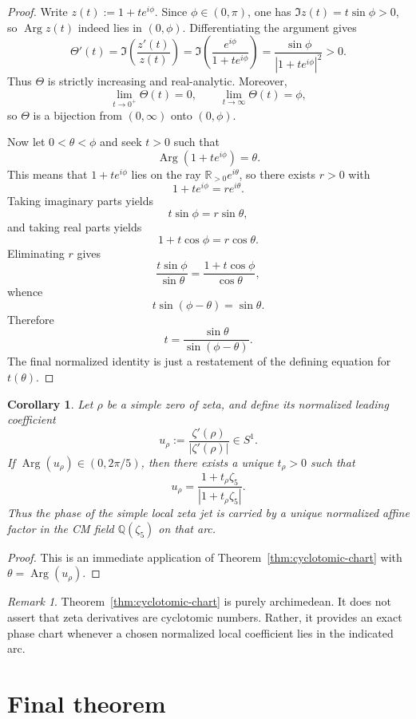 \documentclass[11pt,a4paper]{article}
\newtheorem{corollary}[theorem]{Corollary}
\theoremstyle{definition}
\theoremstyle{remark}
\newtheorem{remark}[theorem]{Remark}
\DeclareMathOperator{\Arg}{Arg}
\newcommand{\RR}{\mathbb R}
\newcommand{\QQ}{\mathbb Q}
\begin{document}
\begin{proof}
Write $z(t):=1+t e^{i\phi}$.  Since $\phi\in(0,\pi)$, one has $\Im z(t)=t\sin\phi>0$, so $\Arg z(t)$ indeed lies in $(0,\phi)$.  Differentiating the argument gives
\[
\Theta'(t)=\Im\!\left(\frac{z'(t)}{z(t)}\right)
=\Im\!\left(\frac{e^{i\phi}}{1+t e^{i\phi}}\right)
=\frac{\sin\phi}{|1+t e^{i\phi}|^2}>0.
\]
Thus $\Theta$ is strictly increasing and real-analytic.  Moreover,
\[
\lim_{t\to0^+}\Theta(t)=0,
\qquad
\lim_{t\to\infty}\Theta(t)=\phi,
\]
so $\Theta$ is a bijection from $(0,\infty)$ onto $(0,\phi)$.

Now let $0<\theta<\phi$ and seek $t>0$ such that
\[
\Arg(1+t e^{i\phi})=\theta.
\]
This means that $1+t e^{i\phi}$ lies on the ray $\RR_{>0}e^{i\theta}$, so there exists $r>0$ with
\[
1+t e^{i\phi}=r e^{i\theta}.
\]
Taking imaginary parts yields
\[
t\sin\phi=r\sin\theta,
\]
and taking real parts yields
\[
1+t\cos\phi=r\cos\theta.
\]
Eliminating $r$ gives
\[
\frac{t\sin\phi}{\sin\theta}=\frac{1+t\cos\phi}{\cos\theta},
\]
whence
\[
t\sin(\phi-\theta)=\sin\theta.
\]
Therefore
\[
t=\frac{\sin\theta}{\sin(\phi-\theta)}.
\]
The final normalized identity is just a restatement of the defining equation for $t(\theta)$.
\end{proof}

\begin{corollary}\label{cor:simple-zero-phase-chart}
Let $\rho$ be a simple zero of zeta, and define its normalized leading coefficient
\[
u_\rho:=\frac{\zeta'(\rho)}{|\zeta'(\rho)|}\in S^1.
\]
If $\Arg(u_\rho)\in(0,2\pi/5)$, then there exists a unique $t_\rho>0$ such that
\[
u_\rho=\frac{1+t_\rho\zeta_5}{|1+t_\rho\zeta_5|}.
\]
Thus the phase of the simple local zeta jet is carried by a unique normalized affine factor in the CM field $\QQ(\zeta_5)$ on that arc.
\end{corollary}

\begin{proof}
This is an immediate application of Theorem~\ref{thm:cyclotomic-chart} with $\theta=\Arg(u_\rho)$.
\end{proof}

\begin{remark}
Theorem~\ref{thm:cyclotomic-chart} is purely archimedean.  It does not assert that zeta derivatives are cyclotomic numbers.  Rather, it provides an exact phase chart whenever a chosen normalized local coefficient lies in the indicated arc.
\end{remark}

\section{Final theorem}
\end{document}

